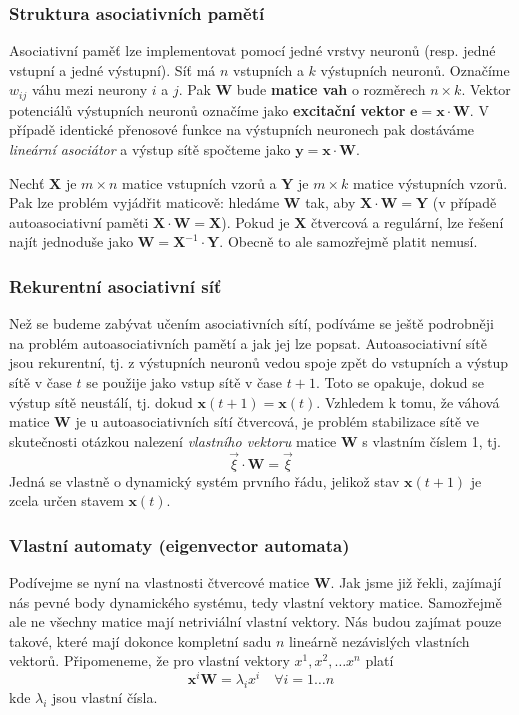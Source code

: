 \documentclass[11pt]{report} %
\renewcommand{\vec}[1]{\mathbf{#1}}
\numberwithin{equation}{section}
\begin{document}
\subsubsection{Struktura asociativních pamětí}
Asociativní paměť lze implementovat pomocí jedné vrstvy neuronů (resp. jedné vstupní a jedné výstupní). Síť má $n$ vstupních a $k$ výstupních neuronů. Označíme $w_{ij}$ váhu mezi neurony $i$ a $j$. Pak $\vec{W}$ bude \textbf{matice vah} o rozměrech $n \times k$. Vektor potenciálů výstupních neuronů označíme jako \textbf{excitační vektor} $\vec{e} = \vec{x}\cdot \vec{W}$. V případě identické přenosové funkce na výstupních neuronech pak dostáváme \textit{lineární asociátor} a výstup sítě spočteme jako $\vec{y} = \vec{x} \cdot \vec{W}$.

Nechť $\vec{X}$ je $m \times n$ matice vstupních vzorů a $\vec{Y}$ je $m \times k$ matice výstupních vzorů. Pak lze problém vyjádřit maticově: hledáme $\vec{W}$ tak, aby $\vec{X}\cdot \vec{W} = \vec{Y}$ (v případě autoasociativní paměti $\vec{X}\cdot \vec{W} = \vec{X}$). Pokud je $\vec{X}$ čtvercová a regulární, lze řešení najít jednoduše jako $\vec{W} = \vec{X}^{-1} \cdot \vec{Y}$. Obecně to ale samozřejmě platit nemusí.

\subsubsection{Rekurentní asociativní síť}
Než se budeme zabývat učením asociativních sítí, podíváme se ještě podrobněji na problém autoasociativních pamětí a jak jej lze popsat. Autoasociativní sítě jsou rekurentní, tj. z výstupních neuronů vedou spoje zpět do vstupních a výstup sítě v čase $t$ se použije jako vstup sítě v čase $t+1$. Toto se opakuje, dokud se výstup sítě neustálí, tj. dokud $\vec{x}(t+1) = \vec{x}(t)$. Vzhledem k tomu, že váhová matice $\vec{W}$ je u autoasociativních sítí čtvercová, je problém stabilizace sítě ve skutečnosti otázkou nalezení \textit{vlastního vektoru} matice $\vec{W}$ s vlastním číslem 1, tj. 
$$\overrightarrow{\xi} \cdot \vec{W} = \overrightarrow{\xi}$$
Jedná se vlastně o dynamický systém prvního řádu, jelikož stav $\vec{x}(t+1)$ je zcela určen stavem $\vec{x}(t)$.

\subsubsection{Vlastní automaty (eigenvector automata)}
Podívejme se nyní na vlastnosti čtvercové matice $\vec{W}$. Jak jsme již řekli, zajímají nás pevné body dynamického systému, tedy vlastní vektory matice. Samozřejmě ale ne všechny matice mají netriviální vlastní vektory. Nás budou zajímat pouze takové, které mají dokonce kompletní sadu $n$ lineárně nezávislých vlastních vektorů. Připomeneme, že pro vlastní vektory $x^1, x^2, \dots x^n$ platí
$$
\vec{x}^i\vec{W} = \lambda_i x^i \quad \forall i = 1 \dots n
$$
kde $\lambda_i$ jsou vlastní čísla.
\end{document}
